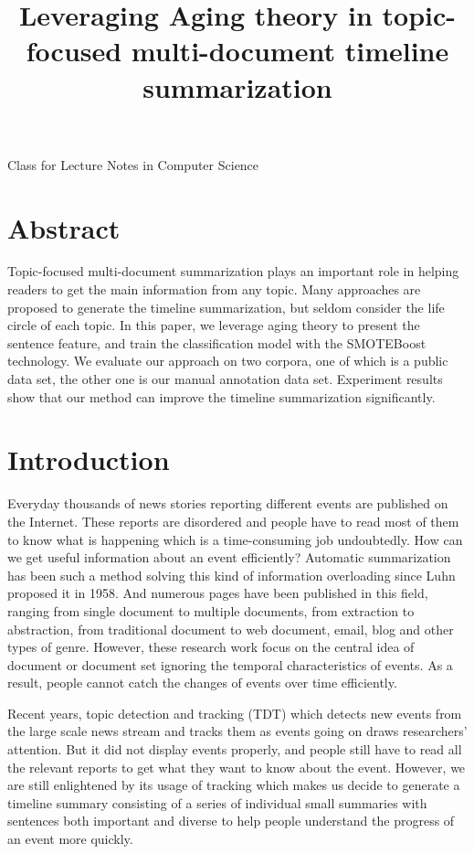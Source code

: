 \documentclass{llncs}
\begin{document}
{\LaTeXe{} Class for Lecture Notes in Computer Science}
\thispagestyle{empty}
\vspace{2pt}
\vfill

%
\title {Leveraging  Aging theory in topic-focused multi-document timeline summarization} 
\maketitle
%
\section{Abstract}

Topic-focused multi-document summarization plays an important role in helping readers to get the main information from any topic. Many approaches are proposed to generate the timeline summarization, but seldom consider the life circle of each topic. In this paper, we leverage aging theory to present the sentence feature, and train the classification model with the SMOTEBoost technology. We evaluate our approach on two corpora, one of which is a public data set, the other one is our manual annotation data set. Experiment results show that our method can improve the timeline summarization significantly. 


%
\section{Introduction}
%


Everyday thousands of news stories reporting different events are published on the Internet. These reports are disordered and people have to read most of them to know what is happening which is a time-consuming job undoubtedly. How can we get useful information about an event efficiently? Automatic summarization has been such a method solving this kind of information overloading since Luhn \cite{1958-Luhn-p159-165} proposed it in 1958. And numerous pages have been published in this field, ranging from single document to multiple documents, from extraction to abstraction, from traditional document to web document, email, blog and other types of genre. However, these research work focus on the central idea of document or document set ignoring the temporal characteristics of events. As a result, people cannot catch the changes of events over time efficiently. 

Recent years, topic detection and tracking (TDT) which detects new events from the large scale news stream and tracks them as events going on draws researchers' attention. But it did not display events properly, and people still have to read all the relevant reports to get what they want to know about the event. However, we are still enlightened by its usage of tracking which makes us decide to generate a timeline summary consisting of a series of individual small summaries with sentences both important and diverse to help people understand the progress of an event more quickly.
\end{document}
